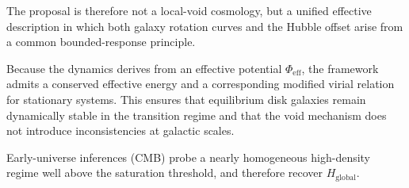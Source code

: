 The proposal is therefore not a local-void cosmology,
but a unified effective description in which both galaxy
rotation curves and the Hubble offset arise from a common bounded-response principle.

Because the dynamics derives from an effective potential $\Phi_{\mathrm{eff}}$,
the framework admits a conserved effective energy and a
corresponding modified virial relation for stationary systems.
This ensures that equilibrium disk galaxies remain dynamically
stable in the transition regime and that the void mechanism
does not introduce inconsistencies at galactic scales.

Early-universe inferences (CMB) probe a nearly homogeneous high-density regime well above the saturation threshold,
and therefore recover $H_{\mathrm{global}}$.
